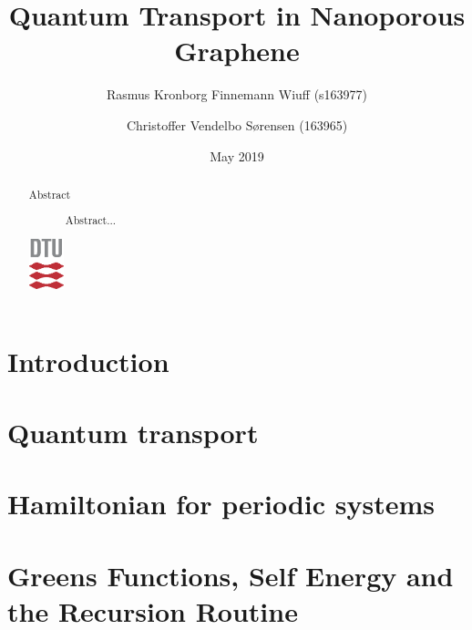 \documentclass[aps, prb, a4paper, english, 12pt, onecolumn, longbibliography, amsmath, amssymb, colorinlistoftodos, floatfix, svgnames]{revtex4-2}
\numberwithin{equation}{section}
\begin{document}
\begin{abstract}
	\vspace{5mm}
	\centering
	\begin{description}
		\item[Abstract] Abstract... \vspace{3\baselineskip}
	\end{description}
	\includegraphics[width=1cm]{Figures/DTU3CMYK.eps}
\end{abstract}

\title{Quantum Transport in Nanoporous Graphene}
\date{May  2019}
\author{Rasmus Kronborg Finnemann Wiuff (s163977)}
\author{Christoffer Vendelbo Sørensen (163965)}
\maketitle

\newpage
{}
\twocolumngrid
\tableofcontents
\thispagestyle{empty}
\newpage
\onecolumngrid

\makeatletter
\let\toc@pre\relax
\let\toc@post\relax
\makeatother

\setcounter{page}{1}
\section{Introduction}

\section{Quantum transport}\label{theorysec}

\section{Hamiltonian for periodic systems}\label{hamilsec}

\section{Greens Functions, Self Energy and the Recursion Routine}\label{greensec}

\end{document}
